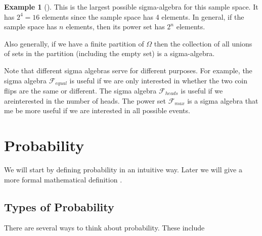\documentclass[
  letterpaper,
]{scrbook}
\theoremstyle{definition}
\theoremstyle{plain}
\theoremstyle{plain}
\theoremstyle{definition}
\newtheorem{example}{Example}[chapter]
\theoremstyle{remark}
\begin{document}
\begin{tcolorbox}
\begin{example}[]
This is the largest possible sigma-algebra for this sample space. It has
\(2^4=16\) elements since the sample space has 4 elements. In general,
if the sample space has \(n\) elements, then its power set has \(2^n\)
elements.

Also generally, if we have a finite partition of \(\Omega\) then the
collection of all unions of sets in the partition (including the empty
set) is a sigma-algebra.

Note that different sigma algebras serve for different purposes. For
example, the sigma algebra \(\mathcal F_{equal}\) is useful if we are
only interested in whether the two coin flips are the same or different.
The sigma algebra \(\mathcal F_{heads}\) is useful if we areinterested
in the number of heads. The power set \(\mathcal F_{max}\) is a sigma
algebra that me be more useful if we are interested in all possible
events.

\end{example}

\end{tcolorbox}

\section{Probability}\label{probability}

We will start by defining probability in an intuitive way. Later we will
give a more formal mathematical definition .

\subsection{Types of Probability}\label{types-of-probability}

There are several ways to think about probability. These include
\end{document}
